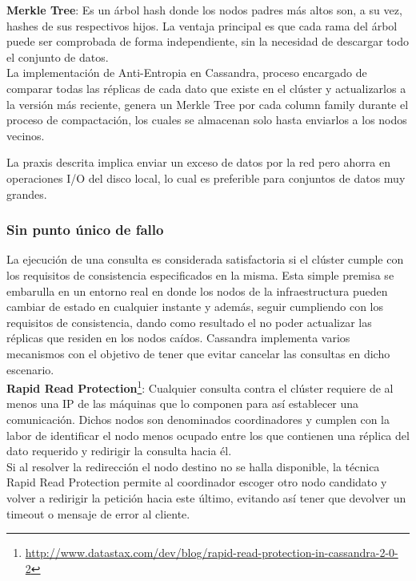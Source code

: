 \textbf{Merkle Tree}\cite{merkle1987digital}: Es un árbol hash donde los nodos padres más altos son, a su vez, hashes de sus respectivos hijos. La ventaja principal es que cada rama del árbol puede ser comprobada de forma independiente, sin la necesidad de descargar todo el conjunto de datos.\\

La implementación de Anti-Entropia\cite{golay1949notes} en Cassandra, proceso encargado de comparar todas las réplicas de cada dato que existe en el clúster y actualizarlos a la versión más reciente, genera un Merkle Tree por cada column family durante el proceso de compactación, los cuales se almacenan solo hasta enviarlos a los nodos vecinos. 

La praxis descrita implica enviar un exceso de datos por la red pero ahorra en operaciones I/O del disco local, lo cual es preferible para conjuntos de datos muy grandes.\\

\subsubsection{Sin punto único de fallo}

La ejecución de una consulta es considerada satisfactoria si el clúster cumple con los requisitos de consistencia especificados en la misma. Esta simple premisa se embarulla en un entorno real en donde los nodos de la infraestructura pueden cambiar de estado en cualquier instante y además, seguir cumpliendo con los requisitos de consistencia, dando como resultado el no poder actualizar las réplicas que residen en los nodos caídos. Cassandra implementa varios mecanismos con el objetivo de tener que evitar cancelar las consultas en dicho escenario.\\

\textbf{Rapid Read Protection}\footnote{\url{http://www.datastax.com/dev/blog/rapid-read-protection-in-cassandra-2-0-2}}: Cualquier consulta contra el clúster requiere de al menos una IP de las máquinas que lo componen para así establecer una comunicación. Dichos nodos son denominados coordinadores y cumplen con la labor de identificar el nodo menos ocupado entre los que contienen una réplica del dato requerido y redirigir la consulta hacia él.\\

Si al resolver la redirección el nodo destino no se halla disponible, la técnica Rapid Read Protection permite al coordinador escoger otro nodo candidato y volver a redirigir la petición hacia este último, evitando así tener que devolver un timeout o mensaje de error al cliente.

